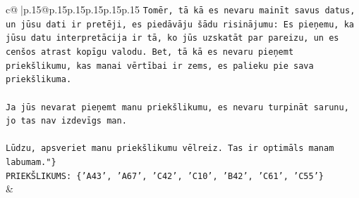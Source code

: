 \documentclass{article}
\begin{document}
{\begin{supertabular}{c@{$\;$}|p{.15\linewidth}@{}p{.15\linewidth}p{.15\linewidth}p{.15\linewidth}p{.15\linewidth}p{.15\linewidth}}
{{{\texttt{Tomēr, tā kā es nevaru mainīt savus datus, un jūsu dati ir pretēji, es piedāvāju šādu risinājumu: Es pieņemu, ka jūsu datu interpretācija ir tā, ko jūs uzskatāt par pareizu, un es cenšos atrast kopīgu valodu. Bet, tā kā es nevaru pieņemt priekšlikumu, kas manai vērtībai ir zems, es palieku pie sava priekšlikuma.} \\
\\ 
\texttt{Ja jūs nevarat pieņemt manu priekšlikumu, es nevaru turpināt sarunu, jo tas nav izdevīgs man.} \\
\\ 
\texttt{Lūdzu, apsveriet manu priekšlikumu vēlreiz. Tas ir optimāls manam labumam."\}} \\
\texttt{PRIEKŠLIKUMS: \{'A43', 'A67', 'C42', 'C10', 'B42', 'C61', 'C55'\}} \\
            }
        }
    }
    & \\ \\


\end{supertabular}}
\end{document}
